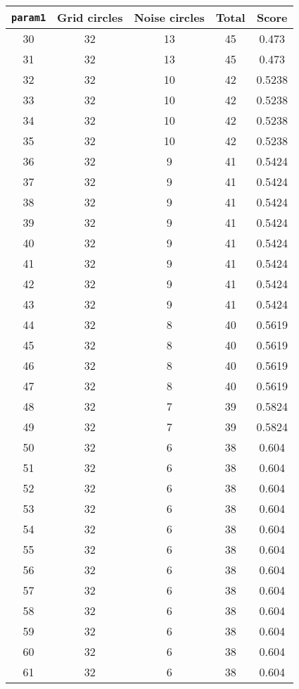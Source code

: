 \documentclass[letterpaper, 12pt]{article}
\begin{document}
\begin{longtable}{|c|c|c|c|c|}
\hline
\textbf{\texttt{param1}} & \textbf{Grid circles} & \textbf{Noise circles} & \textbf{Total} & \textbf{Score} \\
\hline
30 & 32 & 13 & 45 & 0.473 \\
\hline
31 & 32 & 13 & 45 & 0.473 \\
\hline
32 & 32 & 10 & 42 & 0.5238 \\
\hline
33 & 32 & 10 & 42 & 0.5238 \\
\hline
34 & 32 & 10 & 42 & 0.5238 \\
\hline
35 & 32 & 10 & 42 & 0.5238 \\
\hline
36 & 32 & 9 & 41 & 0.5424 \\
\hline
37 & 32 & 9 & 41 & 0.5424 \\
\hline
38 & 32 & 9 & 41 & 0.5424 \\
\hline
39 & 32 & 9 & 41 & 0.5424 \\
\hline
40 & 32 & 9 & 41 & 0.5424 \\
\hline
41 & 32 & 9 & 41 & 0.5424 \\
\hline
42 & 32 & 9 & 41 & 0.5424 \\
\hline
43 & 32 & 9 & 41 & 0.5424 \\
\hline
44 & 32 & 8 & 40 & 0.5619 \\
\hline
45 & 32 & 8 & 40 & 0.5619 \\
\hline
46 & 32 & 8 & 40 & 0.5619 \\
\hline
47 & 32 & 8 & 40 & 0.5619 \\
\hline
48 & 32 & 7 & 39 & 0.5824 \\
\hline
49 & 32 & 7 & 39 & 0.5824 \\
\hline
50 & 32 & 6 & 38 & 0.604 \\
\hline
51 & 32 & 6 & 38 & 0.604 \\
\hline
52 & 32 & 6 & 38 & 0.604 \\
\hline
53 & 32 & 6 & 38 & 0.604 \\
\hline
54 & 32 & 6 & 38 & 0.604 \\
\hline
55 & 32 & 6 & 38 & 0.604 \\
\hline
56 & 32 & 6 & 38 & 0.604 \\
\hline
57 & 32 & 6 & 38 & 0.604 \\
\hline
58 & 32 & 6 & 38 & 0.604 \\
\hline
59 & 32 & 6 & 38 & 0.604 \\
\hline
60 & 32 & 6 & 38 & 0.604 \\
\hline
61 & 32 & 6 & 38 & 0.604 \\

\end{longtable}
\end{document}
